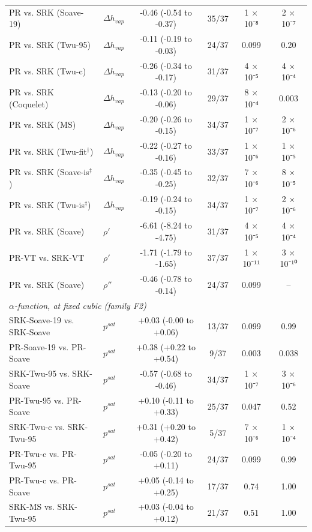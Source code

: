 \begin{table}[H]
\begin{tabular}{llcccc}
PR vs. SRK (Soave-19) & $\Delta h_{vap}$ & -0.46 (-0.54 to -0.37) & 35/37 & 1 × 10⁻⁸ & 2 × 10⁻⁷ \\
PR vs. SRK (Twu-95) & $\Delta h_{vap}$ & -0.11 (-0.19 to -0.03) & 24/37 & 0.099 & 0.20 \\
PR vs. SRK (Twu-c) & $\Delta h_{vap}$ & -0.26 (-0.34 to -0.17) & 31/37 & 4 × 10⁻⁵ & 4 × 10⁻⁴ \\
PR vs. SRK (Coquelet) & $\Delta h_{vap}$ & -0.13 (-0.20 to -0.06) & 29/37 & 8 × 10⁻⁴ & 0.003 \\
PR vs. SRK (MS) & $\Delta h_{vap}$ & -0.20 (-0.26 to -0.15) & 34/37 & 1 × 10⁻⁷ & 2 × 10⁻⁶ \\
PR vs. SRK (Twu-fit$^{\dagger}$) & $\Delta h_{vap}$ & -0.22 (-0.27 to -0.16) & 33/37 & 1 × 10⁻⁶ & 1 × 10⁻⁵ \\
PR vs. SRK (Soave-is$^{\ddagger}$) & $\Delta h_{vap}$ & -0.35 (-0.45 to -0.25) & 32/37 & 7 × 10⁻⁶ & 8 × 10⁻⁵ \\
PR vs. SRK (Twu-is$^{\ddagger}$) & $\Delta h_{vap}$ & -0.19 (-0.24 to -0.15) & 34/37 & 1 × 10⁻⁷ & 2 × 10⁻⁶ \\
PR vs. SRK (Soave) & $\rho'$ & -6.61 (-8.24 to -4.75) & 31/37 & 4 × 10⁻⁵ & 4 × 10⁻⁴ \\
PR-VT vs. SRK-VT & $\rho'$ & -1.71 (-1.79 to -1.65) & 37/37 & 1 × 10⁻¹¹ & 3 × 10⁻¹⁰ \\
PR vs. SRK (Soave) & $\rho''$ & -0.46 (-0.78 to -0.14) & 24/37 & 0.099 & -- \\
\multicolumn{6}{l}{\emph{$\alpha$-function, at fixed cubic (family F2)}} \\
SRK-Soave-19 vs. SRK-Soave & $p^{sat}$ & +0.03 (-0.00 to +0.06) & 13/37 & 0.099 & 0.99 \\
PR-Soave-19 vs. PR-Soave & $p^{sat}$ & +0.38 (+0.22 to +0.54) & 9/37 & 0.003 & 0.038 \\
SRK-Twu-95 vs. SRK-Soave & $p^{sat}$ & -0.57 (-0.68 to -0.46) & 34/37 & 1 × 10⁻⁷ & 3 × 10⁻⁶ \\
PR-Twu-95 vs. PR-Soave & $p^{sat}$ & +0.10 (-0.11 to +0.33) & 25/37 & 0.047 & 0.52 \\
SRK-Twu-c vs. SRK-Twu-95 & $p^{sat}$ & +0.31 (+0.20 to +0.42) & 5/37 & 7 × 10⁻⁶ & 1 × 10⁻⁴ \\
PR-Twu-c vs. PR-Twu-95 & $p^{sat}$ & -0.05 (-0.20 to +0.11) & 24/37 & 0.099 & 0.99 \\
PR-Twu-c vs. PR-Soave & $p^{sat}$ & +0.05 (-0.14 to +0.25) & 17/37 & 0.74 & 1.00 \\
SRK-MS vs. SRK-Twu-95 & $p^{sat}$ & +0.03 (-0.04 to +0.12) & 21/37 & 0.51 & 1.00 \\

\end{tabular}
\end{table}
